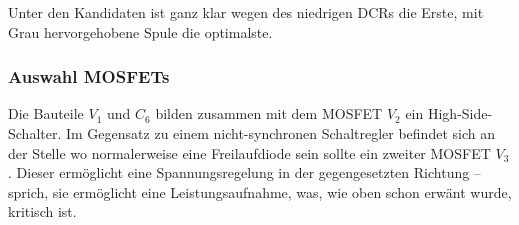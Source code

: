 Unter den Kandidaten ist ganz klar wegen des niedrigen DCRs die Erste,  mit Grau
hervorgehobene Spule die optimalste.

\subsubsection*{Auswahl MOSFETs}

Die  Bauteile  $V_1$  und  $C_6$  bilden  zusammen  mit  dem  MOSFET  $V_2$  ein
High-Side-Schalter. Im Gegensatz zu einem nicht-synchronen Schaltregler befindet
sich  an  der Stelle wo normalerweise eine Freilaufdiode sein sollte ein zweiter
MOSFET $V_3$. Dieser erm\"oglicht  eine  Spannungsregelung in der gegengesetzten
Richtung -- sprich, sie erm\"oglicht eine Leistungsaufnahme, was, wie oben schon
erw\"ant wurde, kritisch ist.

